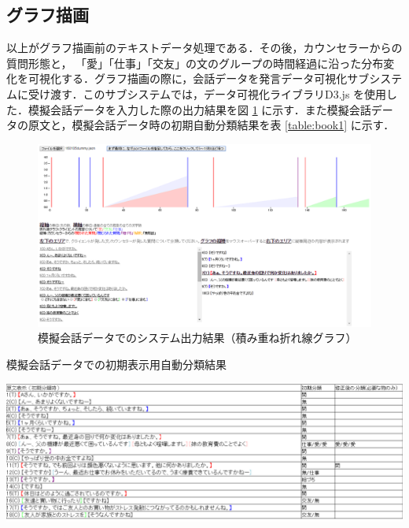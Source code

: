 \documentclass[shuuron]{kuee}
\begin{document}
\subsection{グラフ描画}
以上がグラフ描画前のテキストデータ処理である．その後，カウンセラーからの質問形態と， 「愛」「仕事」「交友」の文のグループの時間経過に沿った分布変化を可視化する．グラフ描画の際に，会話データを発言データ可視化サブシステムに受け渡す．このサブシステムでは，データ可視化ライブラリD3.js
\cite{bostock2012d3}
を使用した．模擬会話データを入力した際の出力結果を図
\ref{fig:6_1}
に示す．また模擬会話データの原文と，模擬会話データ時の初期自動分類結果を表
\ref{table:book1}
に示す．
\begin{figure}
  \begin{center}
    \includegraphics[width=\linewidth]{6_1.png}
  \end{center}
  \caption{模擬会話データでのシステム出力結果（積み重ね折れ線グラフ）}
  \label{fig:6_1}
\end{figure}

\begin{table}
  \caption{模擬会話データでの初期表示用自動分類結果}
  \label{table:book1}
  \begin{center}
    \includegraphics[width=\linewidth]{book1.png}
  \end{center}
\end{table}
\end{document}
